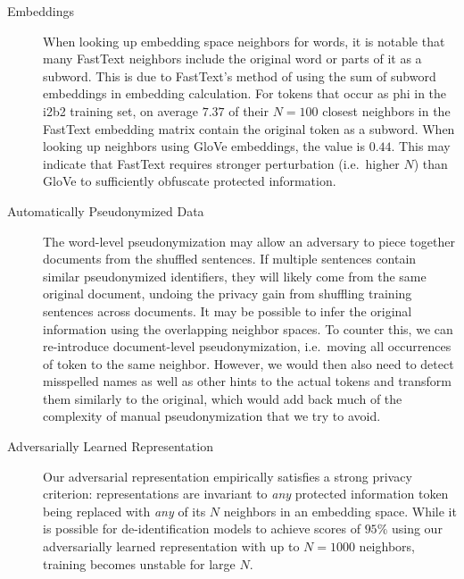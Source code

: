 \begin{description}
    \item[Embeddings]
    When looking up embedding space neighbors for words, it is notable that many FastText neighbors include the original word or parts of it as a subword.
    This is due to FastText's method of using the sum of subword embeddings in embedding calculation.
    For tokens that occur as \ac{phi} in the i2b2 training set, on average $7.37$ of their $N=100$ closest neighbors in the FastText embedding matrix contain the original token as a subword.
    When looking up neighbors using GloVe embeddings, the value is $0.44$.
    This may indicate that FastText requires stronger perturbation (i.e.\ higher $N$) than GloVe to sufficiently obfuscate protected information.
    
    \item[Automatically Pseudonymized Data]
    The word-level pseudonymization may allow an adversary to piece together documents from the shuffled sentences.
    If multiple sentences contain similar pseudonymized identifiers, they will likely come from the same original document, undoing the privacy gain from shuffling training sentences across documents.
    It may be possible to infer the original information using the overlapping neighbor spaces.
    To counter this, we can re-introduce document-level pseudonymization, i.e.\ moving all occurrences of  token to the same neighbor.
    However, we would then also need to detect misspelled names as well as other hints to the actual tokens and transform them similarly to the original, which would add back much of the complexity of manual pseudonymization that we try to avoid.
    
    \item[Adversarially Learned Representation]
    Our adversarial representation empirically satisfies a strong privacy criterion: representations are invariant to \textit{any} protected information token being replaced with \textit{any} of its $N$ neighbors in an embedding space.
    While it is possible for de-identification models to achieve \fone scores of $95\%$ using our adversarially learned representation with up to $N=1000$ neighbors, training becomes unstable for large $N$.
    

\end{description}
